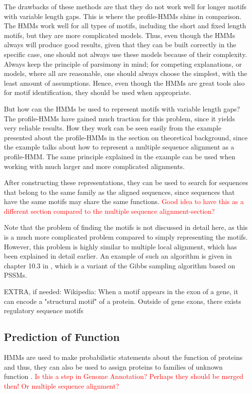 \documentclass{article}
\begin{document}
The drawbacks of these methods are that they do not work well for longer motifs with variable length gaps. This is where the profile-HMMs shine in comparison. The HMMs work well for all types of motifs, including the short and fixed length motifs, but they are more complicated models. Thus, even though the HMMs always will produce good results, given that they can be built correctly in the specific case, one should not always use these models because of their complexity. Always keep the principle of parsimony in mind; for competing explanations, or models, where all are reasonable, one should always choose the simplest, with the least amount of assumptions. Hence, even though the HMMs are great tools also for motif identification, they should be used when appropriate. 

But how can the HMMs be used to represent motifs with variable length gaps? The profile-HMMs have gained much traction for this problem, since it yields very reliable results. How they work can be seen easily from the example presented about the profile-HMMs in the section on theoretical background, since the example talks about how to represent a multiple sequence alignment as a profile-HMM. The same principle explained in the example can be used when working with much larger and more complicated alignments. 

After constructing these representations, they can be used to search for sequences that belong to the same family as the aligned sequences, since sequences that have the same motifs may share the same functions. \textcolor{red}{Good idea to have this as a different section compared to the multiple sequence alignment-section?}

Note that the problem of finding the motifs is not discussed in detail here, as this is a much more complicated problem compared to simply representing the motifs. However, this problem is highly similar to multiple local alignment, which has been explained in detail earlier. An example of such an algorithm is given in chapter 10.3 in \cite{Christianini2006}, which is a variant of the Gibbs sampling algorithm based on PSSMs. 

EXTRA, if needed: 
Wikipedia: When a motif appears in the exon of a gene, it can encode a "structural motif" of a protein. Outside of gene exons, there exists regulatory sequence motifs 

\subsection{Prediction of Function}
HMMs are used to make probabilistic statements about the function of proteins and thus, they can also be used to assign proteins to families of unknown function \cite{Christianini2006}. \textcolor{red}{Is this a step in Genome Annotation? Perhaps they should be merged then! Or multiple sequence alignment?}
\end{document}

